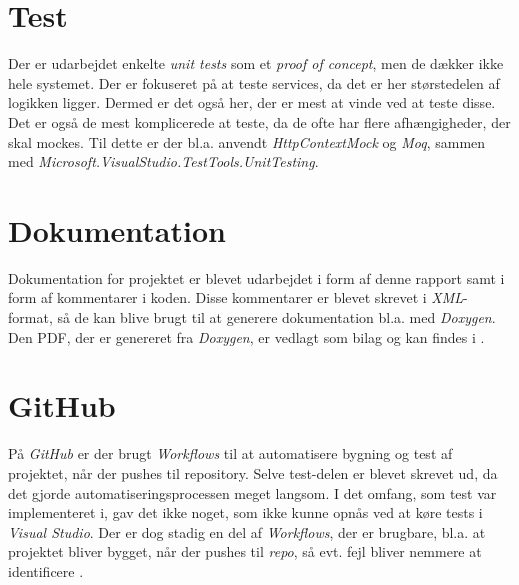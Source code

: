 \section{Test}
\label{sec:test}
Der er udarbejdet enkelte \emph{unit tests} som et \emph{proof of concept}, men de dækker ikke hele systemet. Der er fokuseret på at teste services, da det er her størstedelen af logikken ligger.
Dermed er det også her, der er mest at vinde ved at teste disse. Det er også de mest komplicerede at teste, da de ofte har flere afhængigheder, der skal mockes. 
Til dette er der bl.a. anvendt \emph{HttpContextMock} og \emph{Moq}, sammen med \emph{Microsoft.VisualStudio.TestTools.UnitTesting}.

\section{Dokumentation}
\label{sec:dokumentation}
Dokumentation for projektet er blevet udarbejdet i form af denne rapport samt i form af kommentarer i koden.
Disse kommentarer er blevet skrevet i \emph{XML}-format, så de kan blive brugt til at generere dokumentation bl.a. med \emph{Doxygen}.
Den PDF, der er genereret fra \emph{Doxygen}, er vedlagt som bilag og kan findes i .

\section{GitHub}
\label{subsec:final-product-github}
På \emph{GitHub} er der brugt \emph{Workflows} til at automatisere bygning og test af projektet, når der pushes til repository.
Selve test-delen er blevet skrevet ud, da det gjorde automatiseringsprocessen meget langsom. I det omfang, som test var implementeret i, gav det ikke noget, som ikke kunne opnås ved at køre tests i \emph{Visual Studio}.
Der er dog stadig en del af \emph{Workflows}, der er brugbare, bl.a. at projektet bliver bygget, når der pushes til \emph{repo}, så evt. fejl bliver nemmere at identificere .